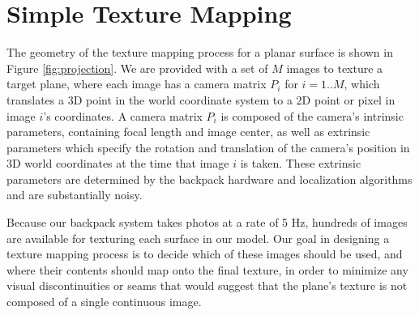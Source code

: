 \documentclass[]{spie}  %
\begin{document}




\section{Simple Texture Mapping}
\label{sec:simpleTextureMapping}

The geometry of the texture mapping process for a planar surface is
shown in Figure \ref{fig:projection}.  We are provided with a set of
$M$ images to texture a target plane, where each image has a camera
matrix $P_i$ for $i=1..M$, which translates a 3D point in the world
coordinate system to a 2D point or pixel in image $i$'s coordinates. A
camera matrix $P_i$ is composed of the camera's intrinsic parameters,
containing focal length and image center, as well as extrinsic
parameters which specify the rotation and translation of the camera's
position in 3D world coordinates at the time that image $i$ is
taken. These extrinsic parameters are determined by the backpack
hardware and localization algorithms \cite{chen2010indoor,
  liu2010indoor, kua2012loopclosure} and are substantially noisy.

Because our backpack system takes photos at a rate of 5 Hz, hundreds
of images are available for texturing each surface in our model. Our
goal in designing a texture mapping process is to decide which of
these images should be used, and where their contents should map onto
the final texture, in order to minimize any visual discontinuities or
seams that would suggest that the plane's texture is not composed of a
single continuous image.
\end{document}
